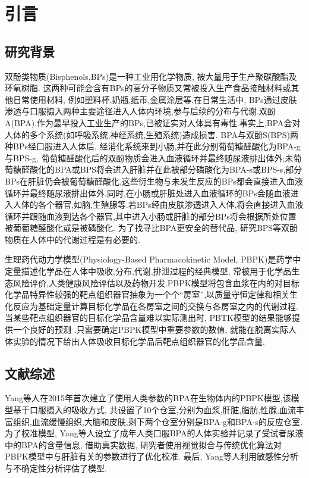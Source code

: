 \documentclass[a4paper,punct=banjiao,twoside]{ctexrep}
\theoremstyle{plain}
\theoremstyle{definition}
\theoremstyle{remark}
\begin{document}
\chapter{引言}

\section{研究背景} 
双酚类物质(Bisphenols,BPs)是一种工业用化学物质, 被大量用于生产聚碳酸酯及环氧树脂\cite{3}. 这两种可能会含有BPs的高分子物质又常被投入生产食品接触材料或其他日常使用材料, 例如塑料杯,奶瓶,纸币,金属涂层等\cite{4}.在日常生活中, BPs通过皮肤渗透与口服摄入两种主要途径进入人体内环境,参与后续的分布与代谢.双酚A(BPA),作为最早投入工业生产的BPs,已被证实对人体具有毒性\cite{2}.事实上,BPA会对人体的多个系统(如呼吸系统,神经系统,生殖系统)造成损害\cite{5}.
BPA与双酚S(BPS)两种BPs经口服进入人体后, 经消化系统来到小肠,并在此分别葡萄糖醛酸化为BPA-g与BPS-g, 葡萄糖醛酸化后的双酚物质会进入血液循环并最终随尿液排出体外;未葡萄糖醛酸化的BPA或BPS将会进入肝脏并在此被部分磷酸化为BPA-s或BPS-s,部分BPs在肝脏仍会被葡萄糖醛酸化,这些衍生物与未发生反应的BPs都会直接进入血液循环并最终随尿液排出体外\cite{2,1}.同时,在小肠或肝脏处进入血液循环的BPs会随血液进入人体的各个器官,如脑,生殖腺等.若BPs经由皮肤渗透进入人体,将会直接进入血液循环并跟随血液到达各个器官,其中进入小肠或肝脏的部分BPs将会根据所处位置被葡萄糖醛酸化或是被磷酸化.
为了找寻比BPA更安全的替代品, 研究BPS等双酚物质在人体中的代谢过程是有必要的\cite{6}.

生理药代动力学模型(Physiology-Based Pharmacokinetic Model, PBPK)是药学中定量描述化学品在人体中吸收,分布,代谢,排泄过程的经典模型,
常被用于化学品生态风险评价,人类健康风险评估以及药物开发\cite{7}.PBPK模型将包含血浆在内的对目标化学品特异性较强的靶点组织器官抽象为一个个``房室'',以质量守恒定律和相关生化反应为基础定量计算目标化学品在各房室之间的交换与各房室之内的代谢过程\cite{8}.当某些靶点组织器官的目标化学品含量难以实际测出时, PBTK模型的结果能够提供一个良好的预测 \cite{7}.只需要确定PBPK模型中重要参数的数值, 就能在脱离实际人体实验的情况下给出人体吸收目标化学品后靶点组织器官的化学品含量.

\section{文献综述} 
Yang等人\cite{10}在2015年首次建立了使用人类参数的BPA在生物体内的PBPK模型,该模型基于口服摄入的吸收方式, 共设置了10个仓室,分别为血浆,肝脏,脂肪,性腺,血流丰富组织,血流缓慢组织,大脑和皮肤,剩下两个仓室分别是BPA-g和BPA-s的反应仓室. 为了校准模型, Yang等人设立了成年人类口服BPA的人体实验并记录了受试者尿液中的BPA的含量信息, 借助真实数据, 研究者使用视觉拟合与传统优化算法对PBPK模型中与肝脏有关的参数进行了优化校准. 最后, Yang等人利用敏感性分析与不确定性分析评估了模型.
\end{document}
